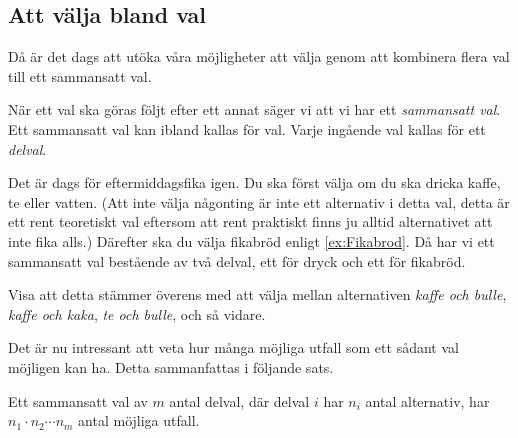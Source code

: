 \subsection{Att välja bland val}
Då är det dags att utöka våra möjligheter att välja genom att kombinera flera
val till ett sammansatt val.

\begin{definition}
  När ett val ska göras följt efter ett annat säger vi att vi har ett
  \emph{sammansatt val}.
  Ett sammansatt val kan ibland kallas för val.
  Varje ingående val kallas för ett \emph{delval}.
\end{definition}

\begin{example}
  Det är dags för eftermiddagsfika igen.
  Du ska först välja om du ska dricka kaffe, te eller vatten.
  (Att inte välja någonting är inte ett alternativ i detta val, detta är ett
  rent teoretiskt val eftersom att rent praktiskt finns ju alltid
  alternativet att inte fika alls.)
  Därefter ska du välja fikabröd enligt \cref{ex:Fikabrod}.
  Då har vi ett sammansatt val bestående av två delval, ett för dryck och ett
  för fikabröd.
\end{example}
\begin{exercise}
  Visa att detta stämmer överens med att välja mellan alternativen \emph{kaffe 
  och bulle}, \emph{kaffe och kaka}, \emph{te och bulle}, och så vidare.
\end{exercise}

Det är nu intressant att veta hur många möjliga utfall som ett sådant val
möjligen kan ha.
Detta sammanfattas i följande sats.

\begin{theorem}[Multiplikationsprincipen]\label{thm:Multiplikationsprincipen}
  Ett sammansatt val av \(m\) antal delval, där delval \(i\) har \(n_i\)
  antal alternativ,
  har \(n_1\cdot n_2\cdots n_m\) antal möjliga utfall.
\end{theorem}

